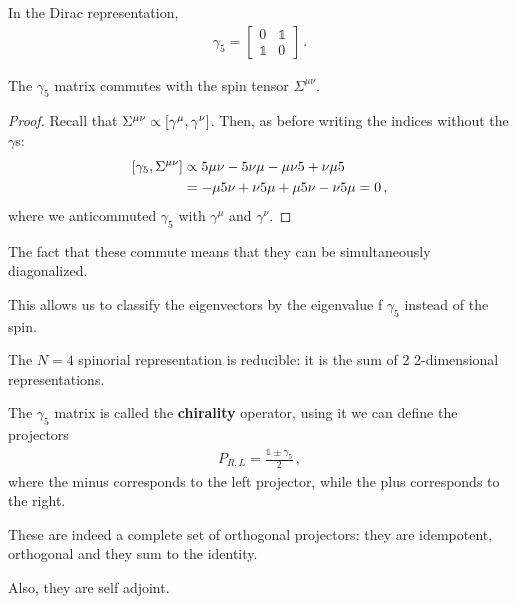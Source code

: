 \documentclass[main.tex]{subfiles}
\begin{document}
In the Dirac representation, 
%
\begin{subequations}
\begin{align}
\gamma_5 = \left[\begin{array}{cc}
0 & \mathbb{1} \\ 
\mathbb{1} & 0
\end{array}\right] 
\,.
\end{align}
\end{subequations}
%

\begin{claim}
The \(\gamma_{5}\) matrix commutes with the spin tensor \(\Sigma^{\mu \nu }\).
\end{claim}

\begin{proof}
Recall that \(\Sigma^{\mu \nu} \propto \qty[\gamma^{\mu}, \gamma^{\nu }]\). Then, as before writing the indices without the \(\gamma \)s: 
%
\begin{subequations}
\begin{align}
\qty[\gamma_5, \Sigma^{\mu \nu }] &\propto 5 \mu \nu - 5 \nu \mu - \mu \nu 5 + \nu \mu 5   \\
&= -\mu 5 \nu + \nu 5 \mu + \mu 5 \nu - \nu 5 \mu  =0
\,,
\end{align}
\end{subequations}
%
where we anticommuted \(\gamma_5 \) with \(\gamma^{\mu }\) and \(\gamma^{\nu }\).
\end{proof}

The fact that these commute means that they can be simultaneously diagonalized.

This allows us to classify the eigenvectors by the eigenvalue f \(\gamma_5 \) instead of the spin.

The \(N=4\) spinorial representation is reducible: it is the sum of 2 2-dimensional representations.

The \(\gamma_5 \) matrix is called the \textbf{chirality} operator, using it we can define the projectors 
%
\begin{align} \label{eq:chirality-projection-operators}
P_{R, L} = \frac{\mathbb{1} \pm \gamma_5 }{2}
\,,
\end{align}
%
where the minus corresponds to the left projector, while the plus corresponds to the right.

\begin{claim}
These are indeed a complete set of orthogonal projectors: they are idempotent, orthogonal and they sum to the identity.

Also, they are self adjoint.
\end{claim}
\end{document}
